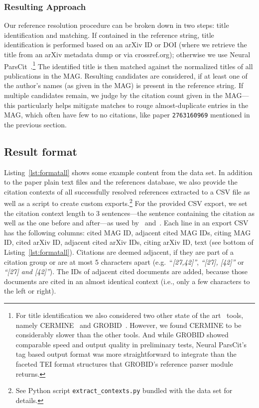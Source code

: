 \subsubsection{Resulting Approach}
Our reference resolution procedure can be broken down in two steps: title identification and matching. If contained in the reference string, title identification is performed based on an arXiv ID or DOI (where we retrieve the title from an arXiv metadata dump or via crossref.org); otherwise we use Neural ParsCit~\cite{neuralparscit}.\footnote{For title identification we also considered two other state of the art~\cite{Tkaczyk2018} tools, namely CERMINE~\cite{Tkaczyk2015} and GROBID~\cite{Lopez2009}. However, we found CERMINE to be considerably slower than the other tools. And while GROBID showed comparable speed and output quality in preliminary tests, Neural ParsCit's tag based output format was more straightforward to integrate than the faceted TEI format structures that GROBID's reference parser module returns.}
The identified title is then matched against the normalized titles of all publications in the MAG. Resulting candidates are considered, if at least one of the author's names (as given in the MAG) is present in the reference string. If multiple candidates remain, we judge by the citation count given in the MAG---this particularly helps mitigate matches to rouge almost-duplicate entries in the MAG, which often have few to no citations, like paper \texttt{2763160969} mentioned in the previous section.

\subsection{Result format}
Listing~\ref{lst:formatall} shows some example content from the data set. In addition to the paper plain text files and the references database, we also provide the citation contexts of all successfully resolved references extracted to a CSV file as well as a script to create custom exports.\footnote{See Python script \texttt{extract\_contexts.py} bundled with the data set for details.} For the provided CSV export, we set the citation context length to 3 sentences---the sentence containing the citation as well as the one before and after---as used by~\cite{Tang2014} and~\cite{Huang2015fixed}. Each line in an export CSV has the following columns: cited MAG ID, adjacent cited MAG IDs, citing MAG ID, cited arXiv ID, adjacent cited arXiv IDs, citing arXiv ID, text (see bottom of Listing~\ref{lst:formatall}). Citations are deemed adjacent, if they are part of a citation group or are at most 5 characters apart (e.g.\ ``\emph{[27,42]''}, \emph{``[27], [42]''} or \emph{``[27] and [42]''}). The IDs of adjacent cited documents are added, because those documents are cited in an almost identical context (i.e., only a few characters to the left or right).

